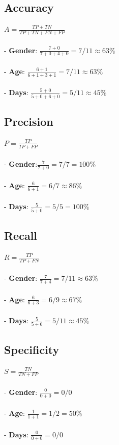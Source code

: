 \begin{multicols}{2}
\subsection{Accuracy}
$ A = \frac{TP+TN}{TP+TN+FN+FP} $
\\\\
- \textbf{Gender}: $\frac{7+0}{7+0+4+0} = 7/11 \approx 63\%$\\\\
- \textbf{Age}: $\frac{6+1}{6+1+3+1} = 7/11 \approx 63\%$\\\\
- \textbf{Days}: $\frac{5+0}{5+0+6+0} = 5/11 \approx 45\%$\\

\subsection{Precision}
$ P = \frac{TP}{TP+FP} $
\\\\
- \textbf{Gender}:$ \frac{7}{7+0} = 7/7 = 100\%$\\\\
- \textbf{Age}: $\frac{6}{6+1} = 6/7 \approx 86\%$\\\\
- \textbf{Days}: $\frac{5}{5+0} = 5/5 = 100\%$\\

\subsection{Recall}
$ R = \frac{TP}{TP+FN} $
\\\\
- \textbf{Gender}: $\frac{7}{7+4} = 7/11 \approx 63\%$\\\\
- \textbf{Age}: $\frac{6}{6+3} = 6/9 \approx 67\%$\\\\
- \textbf{Days}: $\frac{5}{5+6} = 5/11 \approx 45\%$

\subsection{Specificity}
$ S = \frac{TN}{TN+FP} $
\\\\
- \textbf{Gender}: $\frac{0}{0+0} = 0/0$\\\\
- \textbf{Age}: $\frac{1}{1+1} = 1/2 = 50\%$\\\\
- \textbf{Days}: $\frac{0}{0+0} = 0/0$\\

\end{multicols}

